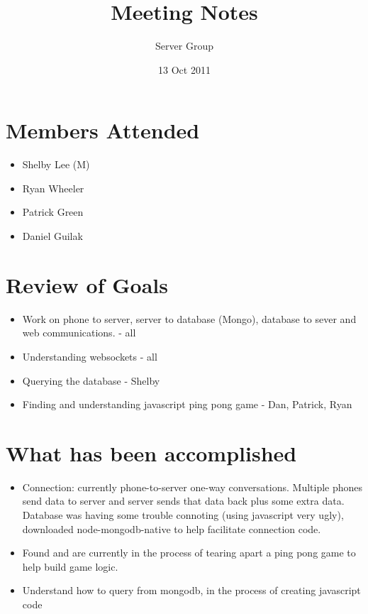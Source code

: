 \documentclass[11pt]{article} %
\title{Meeting Notes}
\author{Server Group}
\date{13 Oct 2011} %
\begin{document}
\maketitle

\section{Members Attended}

\begin{itemize}
        \item Shelby Lee (M)
        \item Ryan Wheeler
        \item Patrick Green
        \item Daniel Guilak
\end{itemize}

\section{Review of Goals}

\begin{itemize}
         \item Work on phone to server, server to database (Mongo), database to sever and web communications. - all
       \item Understanding websockets - all
        \item Querying the database - Shelby
        \item Finding and understanding javascript ping pong game - Dan, Patrick, Ryan


\end{itemize}

\section{What has been accomplished}

\begin{itemize}
        \item Connection: currently phone-to-server one-way conversations. Multiple phones send data to server and server sends that data back plus some extra data. Database was having some trouble connoting (using javascript very ugly), downloaded node-mongodb-native to help facilitate connection code.
       \item Found and are currently in the process of tearing apart a ping pong game to help build game logic.
        \item Understand how to query from mongodb, in the process of creating javascript code
\end{itemize}
\end{document}
